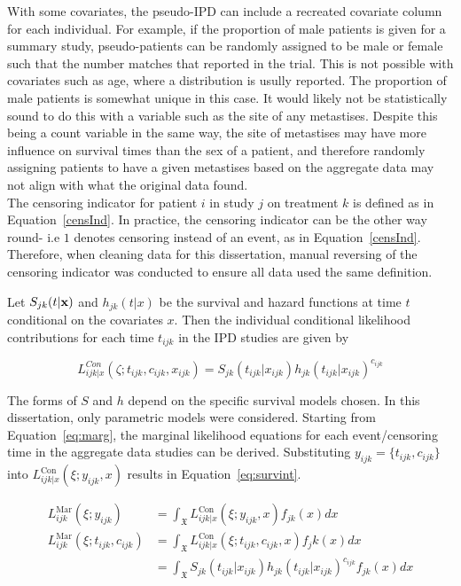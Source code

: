 With some covariates, the pseudo-IPD can include a recreated covariate column for each individual. For example, if the proportion of male patients is given for a summary study, pseudo-patients can be randomly assigned to be male or female such that the number matches that reported in the trial. This is not possible with covariates such as age, where a distribution is usully reported. The proportion of male patients is somewhat unique in this case. It would likely not be statistically sound to do this with a variable such as the site of any metastises. Despite this being a count variable in the same way, the site of metastises may have more influence on survival times than the sex of a patient, and therefore randomly assigning patients to have a given metastises based on the aggregate data may not align with what the original data found. \\ 

The censoring indicator for patient $i$ in study $j$ on treatment $k$ is defined as in Equation~\ref{censInd}. In practice, the censoring indicator can be the other way round- i.e $1$ denotes censoring instead of an event, as in Equation~\ref{censInd}. Therefore, when cleaning data for this dissertation, manual reversing of the censoring indicator was conducted to ensure all data used the same definition. 

Let $S_{jk}(t|\bf{x})$ and $h_{jk}(t|x)$ be the survival and hazard functions at time $t$ conditional on the covariates $x$. Then the individual conditional likelihood contributions for each time $t_{ijk}$ in the IPD studies are given by

\begin{equation}
    L_{ijk|x}^{Con}(\zeta;t_{ijk},c_{ijk},x_{ijk}) = S_{jk}(t_{ijk}| x_{ijk})h_{jk}(t_{ijk}|x_{ijk})^{c_{ijk}}
\end{equation}

The forms of $S$ and $h$ depend on the specific survival models chosen. In this dissertation, only parametric models were considered. Starting from Equation~\ref{eq:marg}, the marginal likelihood equations for each event/censoring time in the aggregate data studies can be derived. Substituting $y_{ijk} = \{t_{ijk}, c_{ijk}\}$ into $L_{ijk|x}^{\text{Con}}(\xi; y_{ijk}, x)$ results in Equation~\ref{eq:survint}.

\begin{align}
    L_{ijk}^{\text{Mar}}(\xi; y_{ijk}) &= \int_{\mathfrak{X}} L_{ijk|x}^{\text{Con}}(\xi; y_{ijk}, x)f_{jk}(x)dx \\ 
    L_{ijk}^{\text{Mar}}(\xi; t_{ijk}, c_{ijk}) &= \int_{\mathfrak{X}} L_{ijk|x}^{\text{Con}}(\xi; t_{ijk}, c_{ijk}, x)f_jk(x)dx \\
                                       &= \int_{\mathfrak{X}} S_{jk}(t_{ijk}| x_{ijk})h_{jk}(t_{ijk}|x_{ijk})^{c_{ijk}} f_{jk}(x)dx\label{eq:survint}
\end{align}

